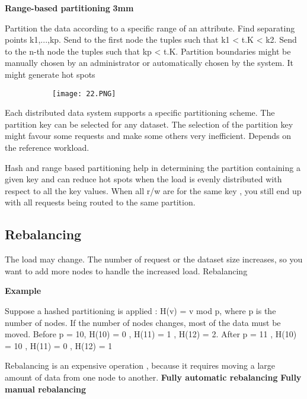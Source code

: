 \documentclass{article}
\begin{document}
\vspace{3mm}
\textbf{Range-based partitioning}
\textbf{3mm}

Partition the data according to a specific range of an attribute. Find separating points k1,...,kp. Send to the first node the tuples such that k1 < t.K < k2. Send to the n-th node the tuples such that kp < t.K. 
Partition boundaries might be manually chosen by an administrator or automatically chosen by the system. It might generate hot spots

\begin{figure}[ht!]
  \centering
  \begin{subfigure}[b]{0.35\linewidth}
    \texttt{[image: 22.PNG]}
  \end{subfigure}
\end{figure}

Each distributed data system supports a specific partitioning scheme. The partition key can be selected for any dataset. The selection of the partition key might favour some requests and make some others very inefficient. Depends on the reference workload.

Hash and range based partitioning help in determining the partition containing a given key and can reduce hot spots when the load is evenly distributed with respect to all the key values. When all r/w are for the same key , you still end up with all requests being routed to the same partition.

\subsection{Rebalancing}

The load may change. The number of request or the dataset size increases, so you want to add more nodes to handle the increased load. 
Rebalancing 

\textbf{Example}
\vspace{3mm}

Suppose a hashed partitioning is applied : H(v) = v mod p, where p is the number of nodes. If the number of nodes changes, most of the data must be moved.
Before p = 10, H(10) = 0 , H(11) = 1 , H(12) = 2. After p = 11 , H(10) = 10 , H(11) = 0 , H(12) = 1

Rebalancing is an expensive operation , because it requires moving a large amount of data from one node to another. 
\textbf{Fully automatic rebalancing} 
\textbf{Fully manual rebalancing}  
\end{document}
